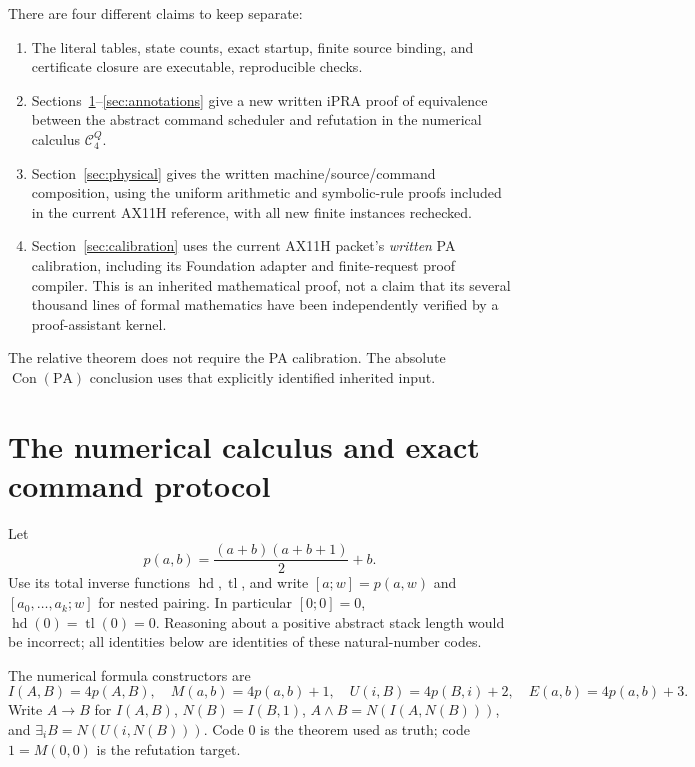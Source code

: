 \documentclass[11pt,a4paper]{article}
\newcommand{\ipra}{\mathrm{iPRA}}
\newcommand{\PA}{\mathrm{PA}}
\newcommand{\Con}{\operatorname{Con}}
\newcommand{\hd}{\operatorname{hd}}
\newcommand{\tl}{\operatorname{tl}}
\begin{document}
There are four different claims to keep separate:
\begin{enumerate}
\item The literal tables, state counts, exact startup, finite source
binding, and certificate closure are executable, reproducible checks.
\item Sections~\ref{sec:protocol}--\ref{sec:annotations} give a new written
$\ipra$ proof of equivalence between the abstract command scheduler and
refutation in the numerical calculus $\mathcal C^Q_4$.
\item Section~\ref{sec:physical} gives the written machine/source/command
composition, using the uniform arithmetic and symbolic-rule proofs
included in the current AX11H reference, with all new finite instances
rechecked.
\item Section~\ref{sec:calibration} uses the current AX11H packet's
\emph{written} PA calibration, including its Foundation adapter and
finite-request proof compiler. This is an inherited mathematical proof,
not a claim that its several thousand lines of formal mathematics have
been independently verified by a proof-assistant kernel.
\end{enumerate}
The relative theorem does not require the PA calibration. The absolute
$\Con(\PA)$ conclusion uses that explicitly identified inherited input.

\section{The numerical calculus and exact command protocol}
\label{sec:protocol}

Let
\[
 p(a,b)=\frac{(a+b)(a+b+1)}2+b.
\]
Use its total inverse functions $\hd,\tl$, and write
$[a;w]=p(a,w)$ and $[a_0,\ldots,a_k;w]$ for nested pairing.
In particular $[0;0]=0$, $\hd(0)=\tl(0)=0$. Reasoning about a positive
abstract stack length would be incorrect; all identities below are
identities of these natural-number codes.

The numerical formula constructors are
\[
 I(A,B)=4p(A,B),\quad M(a,b)=4p(a,b)+1,\quad
 U(i,B)=4p(B,i)+2,\quad E(a,b)=4p(a,b)+3.
\]
Write $A\to B$ for $I(A,B)$,
$N(B)=I(B,1)$,
$A\wedge B=N(I(A,N(B)))$, and
$\exists_i B=N(U(i,N(B)))$.
Code $0$ is the theorem used as truth; code $1=M(0,0)$ is the
refutation target.
\end{document}
